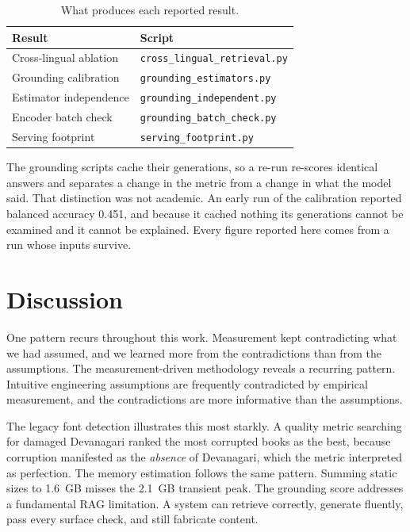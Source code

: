 \begin{table}
\caption{What produces each reported result.}
\label{tab:repro}
\centering
\footnotesize
\begin{tabular}{@{}ll@{}}
\toprule
\textbf{Result} & \textbf{Script} \\
\midrule
Cross-lingual ablation & \texttt{cross\_lingual\_retrieval.py} \\
Grounding calibration  & \texttt{grounding\_estimators.py} \\
Estimator independence & \texttt{grounding\_independent.py} \\
Encoder batch check    & \texttt{grounding\_batch\_check.py} \\
Serving footprint      & \texttt{serving\_footprint.py} \\
\bottomrule
\end{tabular}
\end{table}

The grounding scripts cache their generations, so a re-run re-scores identical answers and separates a change in the metric from a change in what the model said. That distinction was not academic. An early run of the calibration reported balanced accuracy 0.451, and because it cached nothing its generations cannot be examined and it cannot be explained. Every figure reported here comes from a run whose inputs survive.
\fi


\section{Discussion}

\ifconf
One pattern recurs throughout this work. Measurement kept contradicting what we had assumed, and we learned more from the contradictions than from the assumptions.
\else
The measurement-driven methodology reveals a recurring pattern. Intuitive engineering assumptions are frequently contradicted by empirical measurement, and the contradictions are more informative than the assumptions.
\fi

\ifconf\else  %
The legacy font detection illustrates this most starkly. A quality metric searching for damaged Devanagari ranked the most corrupted books as the best, because corruption manifested as the \textit{absence} of Devanagari, which the metric interpreted as perfection. The memory estimation follows the same pattern. Summing static sizes to 1.6~GB misses the 2.1~GB transient peak. The grounding score addresses a fundamental RAG limitation. A system can retrieve correctly, generate fluently, pass every surface check, and still fabricate content.
\fi

